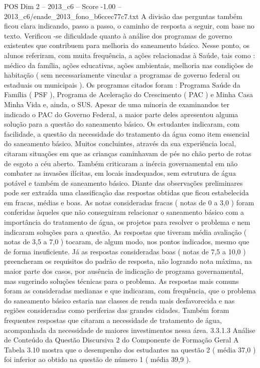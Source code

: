\begin{textsample}{POS Dim 2 – 2013\_c6 – Score -1.00 – 2013\_c6/enade\_2013\_fono\_b6ccec77c7.txt}
A divisão das perguntas também ficou clara indicando, passo a passo, o caminho de resposta a seguir, com base no texto.
Verificou -se dificuldade quanto à análise dos programas de governo existentes que contribuem para melhoria do saneamento básico.
Nesse ponto, os alunos referiram, com muita frequência, a ações relacionadas à Saúde, tais como : médico da família, ações educativas, ações ambientais, melhoria nas condições de habitação ( sem necessariamente vincular a programas de governo federal ou estaduais ou municipais ).
Os programas citados foram : Programa Saúde da Família ( PSF ), Programa de Aceleração do Crescimento ( PAC ) e Minha Casa Minha Vida e, ainda, o SUS.
Apesar de uma minoria de examinandos ter indicado o PAC do Governo Federal, a maior parte deles apresentou alguma solução para a questão do saneamento básico.
Os estudantes indicaram, com facilidade, a questão da necessidade do tratamento da água como item essencial do saneamento básico.
Muitos concluintes, através da sua experiência local, citaram situações em que as crianças caminhavam de pés no chão perto de rotas de esgoto a céu aberto.
Também criticaram a inércia governamental em não combater as invasões ilícitas, em locais inadequados, sem estrutura de água potável e também de saneamento básico.
Diante das observações preliminares pode ser extraída uma classificação das respostas obtidas que ficou estabelecida em fracas, médias e boas.
As notas consideradas fracas ( notas de 0 a 3,0 ) foram conferidas àqueles que não conseguiram relacionar o saneamento básico com a importância do tratamento de água, os projetos para resolver o problema e nem indicaram soluções para a questão.
As respostas que tiveram média avaliação ( notas de 3,5 a 7,0 ) tocaram, de algum modo, nos pontos indicados, mesmo que de forma insuficiente.
Já as respostas consideradas boas ( notas de 7,5 a 10,0 ) preencheram os requisitos do padrão de resposta, não logrando nota máxima, na maior parte dos casos, por ausência de indicação de programa governamental, mas sugerindo soluções técnicas para o problema.
As respostas mais comuns foram as consideradas medianas e que indicaram, com frequência, que o problema do saneamento básico estaria nas classes de renda mais desfavorecida e nas regiões consideradas como periferias das grandes cidades.
Também foram frequentes respostas que citaram a necessidade de tratamento de água, acompanhada da necessidade de maiores investimentos nessa área. 3.3.1.3 Análise de Conteúdo da Questão Discursiva 2 do Componente de Formação Geral A Tabela 3.10 mostra que o desempenho dos estudantes na questão 2 ( média 37,0 ) foi inferior ao obtido na questão de número 1 ( média 39,9 ).

\end{textsample}
